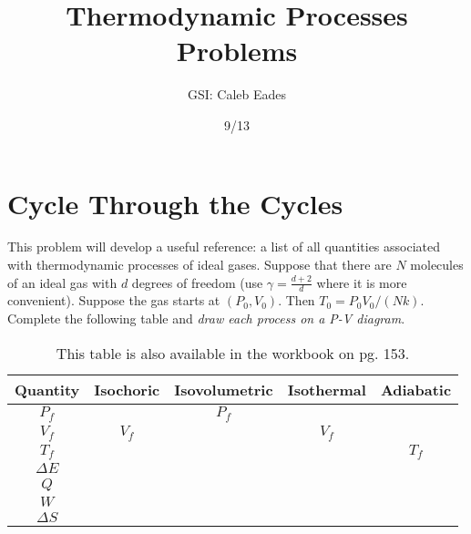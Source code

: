 \documentclass{article}
\begin{document}
\title{Thermodynamic Processes Problems}
\author{GSI: Caleb Eades}
\date{9/13}
\maketitle

\section{Cycle Through the Cycles}

This problem will develop a useful reference: a list of all quantities associated with thermodynamic processes of ideal gases. Suppose that there are $N$ molecules of an ideal gas with $d$ degrees of freedom (use $\gamma = \frac{d+2}{d}$ where it is more convenient). Suppose the gas starts at $(P_0,V_0)$. Then $T_0 = P_0V_0/(Nk)$. Complete the following table and \textit{draw each process on a P-V diagram}.

\def\arraystretch{2.5}
\begin{table}[h]
	\begin{center}
	\caption{This table is also available in the workbook on pg. 153.}
	
	\begin{tabular}{| >{\Large}c|c|c|c|c|}
		\hline
		\normalsize{\textbf{Quantity}} & \textbf{Isochoric} & \textbf{Isovolumetric} & \textbf{Isothermal} & \textbf{Adiabatic} \\ \hline
		$P_f$             &                   & $P_f$                  &                     &                    \\ \hline
		$V_f$             & $V_f$             &                        & $V_f$               &                    \\ \hline
		$T_f$             &                   &                        &                     & $T_f$              \\ \hline
		$\Delta E$        &                   &                        &                     &                    \\ \hline
		$Q$               &                   &                        &                     &                    \\ \hline
		$W$               &                   &                        &                     &                    \\ \hline
		$\Delta S$        &                   &                        &                     &                    \\ \hline
	\end{tabular}
	\end{center}
\end{table}
\end{document}
